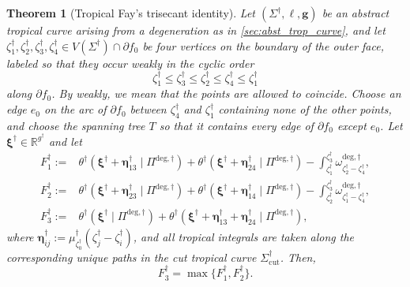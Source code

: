 \documentclass[12pt]{amsart}
\numberwithin{equation}{section}
\newtheorem{theorem}{Theorem}[section]
\theoremstyle{definition}
\newcommand{\R}{\mathbb{R}}
\def\vertices{V}
\def\trop{\dagger}
\def\vecptjac{\bm{\xi}}
\def\ptSig{\zeta}
\def\baseptT{{\ptSig_0^\trop}}
\def\mcurve{\Sigma}
\def\tropmcurve{\mcurve^\trop}
\begin{document}
\begin{theorem}[Tropical Fay's trisecant identity]
\label{thm:tropical_fay}
Let $(\tropmcurve,\ell,\bm g)$ be an abstract tropical curve arising from
a degeneration as in \cref{sec:abst_trop_curve}, and let
$
\ptSig^\trop_1,\ptSig^\trop_2,\ptSig^\trop_3,\ptSig^\trop_4
\in
\vertices(\tropmcurve)\cap\partial f_0
$
be four vertices on the boundary of the outer face, labeled so that they occur weakly in the cyclic order
\[
\ptSig^\trop_1 \leq \ptSig^\trop_3 \leq \ptSig^\trop_2 \leq \ptSig^\trop_4 \leq \ptSig^\trop_1
\]
along $\partial f_0$. By weakly, we mean that the points are allowed to coincide. Choose an edge $e_0$ on the arc of $\partial f_0$ between $\ptSig_4^\trop$ and $\ptSig_1^\trop$ containing none of the other points, and choose the spanning tree $T$ so that it
contains every edge of $\partial f_0$ except $e_0$. Let $\vecptjac^\trop \in \R^{g^\trop}$ and let 
\[
\begin{aligned}
F_1^\trop
:={}&
\theta^\trop(
\vecptjac^\trop+\bm \eta_{13}^\trop
\mid
\Pi^{\mathrm{deg},\trop}
)
+
\theta^\trop(
\vecptjac^\trop+\bm \eta_{24}^\trop
\mid
\Pi^{\mathrm{deg},\trop}
)
-
\int_{\ptSig_1^\trop}^{\ptSig_3^\trop}
\omega_{\ptSig_2^\trop-\ptSig_4^\trop}^{\mathrm{deg},\trop},
\\
F_2^\trop
:={}&
\theta^\trop(
\vecptjac^\trop+\bm \eta_{23}^\trop
\mid
\Pi^{\mathrm{deg},\trop}
)
+
\theta^\trop(
\vecptjac^\trop+\bm \eta_{14}^\trop
\mid
\Pi^{\mathrm{deg},\trop}
)
-
\int_{\ptSig_2^\trop}^{\ptSig_3^\trop}
\omega_{\ptSig_1^\trop-\ptSig_4^\trop}^{\mathrm{deg},\trop},
\\
F_3^\trop
:={}&
\theta^\trop(
\vecptjac^\trop
\mid
\Pi^{\mathrm{deg},\trop}
)
+
\theta^\trop(
\vecptjac^\trop
+
\bm \eta_{13}^\trop
+
\bm \eta_{24}^\trop
\mid
\Pi^{\mathrm{deg},\trop}
),
\end{aligned}
\]
where $\bm \eta_{ij}^\trop
:=
\mu_{\baseptT}^{\trop}(\ptSig_j^\trop-\ptSig_i^\trop)$, and all tropical integrals are taken along the corresponding unique paths in the cut tropical curve $\tropmcurve_{\mathrm{cut}}$. Then,
\[
F_3^\trop
=
\max
\{
F_1^\trop,
F_2^\trop
\}.
\]
\end{theorem}
\end{document}
